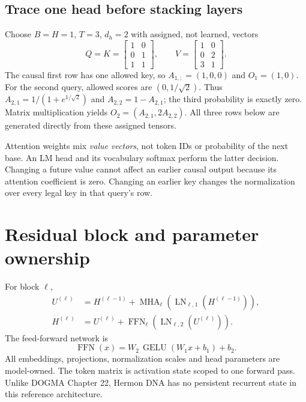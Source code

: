 \subsection{Trace one head before stacking layers}
Choose $B=H=1$, $T=3$, $d_h=2$ with assigned, not learned, vectors
\[
Q=K=\begin{bmatrix}1&0\\0&1\\1&1\end{bmatrix},\qquad
V=\begin{bmatrix}1&0\\0&2\\3&1\end{bmatrix}.
\]
The causal first row has one allowed key, so $A_{1,:}=(1,0,0)$ and $O_1=(1,0)$.
For the second query, allowed scores are $(0,1/\sqrt2)$. Thus
$A_{2,1}=1/(1+e^{1/\sqrt2})$ and $A_{2,2}=1-A_{2,1}$; the third
probability is exactly zero. Matrix multiplication yields
$O_2=(A_{2,1},2A_{2,2})$. All three rows below are generated directly from
these assigned tensors.
\begin{center}\end{center}
Attention weights mix \emph{value vectors}, not token IDs or probability of the
next base. An LM head and its vocabulary softmax perform the latter decision.
Changing a future value cannot affect an earlier causal output because its
attention coefficient is zero. Changing an earlier key changes the normalization
over every legal key in that query's row.

\section{Residual block and parameter ownership}

For block $\ell$,
\begin{align}
U^{(\ell)} &= H^{(\ell-1)}
 +\operatorname{MHA}_\ell(\operatorname{LN}_{\ell,1}(H^{(\ell-1)})),\\
H^{(\ell)} &= U^{(\ell)}
 +\operatorname{FFN}_\ell(\operatorname{LN}_{\ell,2}(U^{(\ell)})).
\end{align}
The feed-forward network is
\[
\operatorname{FFN}(x)=W_2\,\operatorname{GELU}(W_1x+b_1)+b_2.
\]
All embeddings, projections, normalization scales and head parameters are
model-owned. The token matrix is activation state scoped to one forward pass. Unlike
DOGMA Chapter 22, Hermon DNA has no persistent recurrent state in this reference
architecture.

